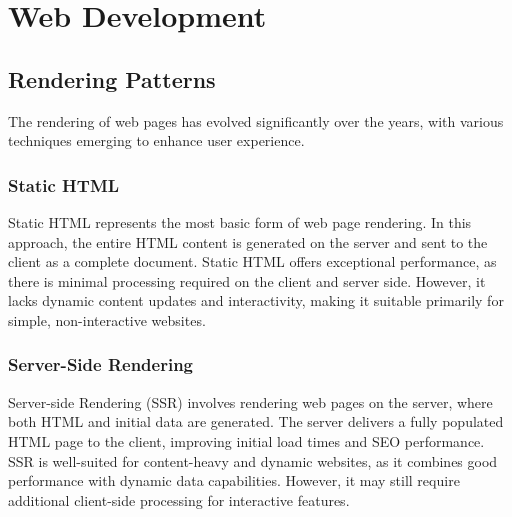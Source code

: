 \section{Web Development}
\label{sec:web-development}


\subsection{Rendering Patterns}
\label{sec:rendering-patterns}


The rendering of web pages has evolved significantly over the years, with various techniques emerging to enhance user experience. 

\subsubsection{Static HTML}
Static HTML represents the most basic form of web page rendering. In this approach, the entire HTML content is generated on the server and sent to the client as a complete document. Static HTML offers exceptional performance, as there is minimal processing required on the client and server side. However, it lacks dynamic content updates and interactivity, making it suitable primarily for simple, non-interactive websites.

\subsubsection{Server-Side Rendering}
Server-side Rendering (SSR) involves rendering web pages on the server, where both HTML and initial data are generated. The server delivers a fully populated HTML page to the client, improving initial load times and SEO performance. SSR is well-suited for content-heavy and dynamic websites, as it combines good performance with dynamic data capabilities. However, it may still require additional client-side processing for interactive features.

